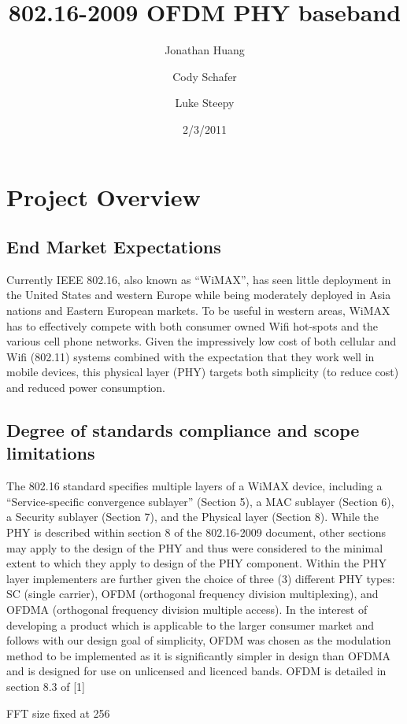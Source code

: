 \documentclass[10pt]{article}
\title{802.16-2009 OFDM PHY baseband}
\author{Jonathan Huang \and Cody Schafer \and Luke Steepy}
\date{2/3/2011}
\begin{document}
\maketitle
\section{Project Overview}
	\subsection{End Market Expectations}
	Currently IEEE 802.16, also known as “WiMAX”, has seen little deployment in the
	United States and western Europe while being moderately deployed in Asia
	nations and Eastern European markets. To be useful in western areas, WiMAX has
	to effectively compete with both consumer owned Wifi hot-spots and the various
	cell phone networks. Given the impressively low cost of both cellular and Wifi
	(802.11) systems combined with the expectation that they work well in mobile
	devices, this physical layer (PHY) targets both simplicity (to reduce cost) and
	reduced power consumption.

	\subsection{Degree of standards compliance and scope limitations}
	The 802.16 standard specifies multiple layers of a WiMAX device, including a
	“Service-specific convergence sublayer” (Section 5), a MAC sublayer (Section
	6), a Security sublayer (Section 7), and the Physical layer (Section 8). While
	the PHY is described within section 8 of the 802.16-2009 document, other
	sections may apply to the design of the PHY and thus were considered to the
	minimal extent to which they apply to design of the PHY component.  Within the
	PHY layer implementers are further given the choice of three (3) different PHY
	types: SC (single carrier), OFDM (orthogonal frequency division multiplexing),
	and OFDMA (orthogonal frequency division multiple access). In the interest of
	developing a product which is applicable to the larger consumer market and
	follows with our design goal of simplicity, OFDM was chosen as the modulation
	method to be implemented as it is significantly simpler in design than OFDMA
	and is designed for use on unlicensed and licenced bands. OFDM is detailed in
	section 8.3 of [1]

	FFT size fixed at 256
\end{document}
